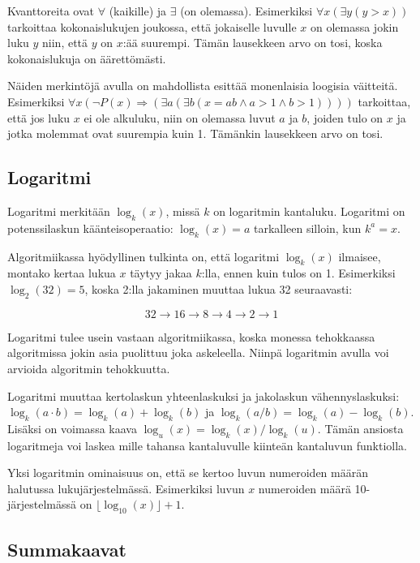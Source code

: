 Kvanttoreita ovat $\forall$ (kaikille) ja $\exists$
(on olemassa).
Esimerkiksi $\forall x (\exists y (y > x))$
tarkoittaa kokonaislukujen joukossa,
että jokaiselle luvulle $x$ on olemassa
jokin luku $y$ niin, että $y$ on $x$:ää suurempi.
Tämän lausekkeen arvo on tosi, koska kokonaislukuja
on äärettömästi.

Näiden merkintöjä avulla on mahdollista esittää
monenlaisia loogisia väitteitä.
Esimerkiksi
$\forall x (\lnot P(x) \Rightarrow (\exists a (\exists b (x = ab \land a > 1 \land b > 1))))$
tarkoittaa, että jos luku $x$ ei ole alkuluku,
niin on olemassa luvut $a$ ja $b$,
joiden tulo on $x$ ja jotka molemmat ovat suurempia kuin 1.
Tämänkin lausekkeen arvo on tosi.

\subsection{Logaritmi}


Logaritmi merkitään $\log_k(x)$, missä $k$ on logaritmin kantaluku.
Logaritmi on potenssilaskun käänteisoperaatio:
$\log_k(x)=a$ tarkalleen silloin, kun $k^a=x$.

Algoritmiikassa hyödyllinen tulkinta on,
että logaritmi $\log_k(x)$ ilmaisee, montako kertaa lukua $x$
täytyy jakaa $k$:lla, ennen kuin tulos on 1.
Esimerkiksi $\log_2(32)=5$, koska 2:lla jakaminen
muuttaa lukua 32 seuraavasti:

\[32 \rightarrow 16 \rightarrow 8 \rightarrow 4 \rightarrow 2 \rightarrow 1 \]

Logaritmi tulee usein vastaan algoritmiikassa,
koska monessa tehokkaassa algoritmissa jokin asia puolittuu
joka askeleella.
Niinpä logaritmin avulla voi arvioida algoritmin tehokkuutta.

Logaritmi muuttaa kertolaskun yhteenlaskuksi ja
jakolaskun vähennyslaskuksi:
$\log_k(a \cdot b) = \log_k(a)+\log_k(b)$ ja
$\log_k(a / b) = \log_k(a)-\log_k(b)$.
Lisäksi on voimassa kaava $\log_u(x) = \log_k(x)/\log_k(u)$.
Tämän ansiosta logaritmeja voi laskea mille tahansa kantaluvulle
kiinteän kantaluvun funktiolla.

Yksi logaritmin ominaisuus on, että se kertoo luvun numeroiden
määrän halutussa lukujärjestelmässä.
Esimerkiksi luvun $x$ numeroiden määrä 10-jär\-jes\-tel\-mäs\-sä on
$\lfloor \log_{10}(x)\rfloor + 1$.

\subsection{Summakaavat}

